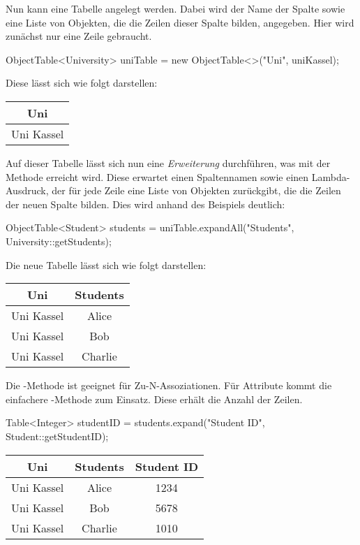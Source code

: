 Nun kann eine Tabelle angelegt werden.
Dabei wird der Name der Spalte sowie eine Liste von Objekten, die die Zeilen dieser Spalte bilden, angegeben.
Hier wird zunächst nur eine Zeile gebraucht.

\begin{jcodeblock}
    ObjectTable<University> uniTable = new ObjectTable<>("Uni", uniKassel);
\end{jcodeblock}

Diese lässt sich wie folgt darstellen:

\begin{tabular}{|c|}
    \hline
    \textbf{Uni} \\
    \hline
    Uni Kassel \\
    \hline
\end{tabular}

Auf dieser Tabelle lässt sich nun eine \emph{Erweiterung} durchführen, was mit der Methode  erreicht wird.
Diese erwartet einen Spaltennamen sowie einen Lambda-Ausdruck,
der für jede Zeile eine Liste von Objekten zurückgibt, die die Zeilen der neuen Spalte bilden.
Dies wird anhand des Beispiels deutlich:

\begin{jcodeblock}[breaklines]
    ObjectTable<Student> students = uniTable.expandAll("Students", University::getStudents);
\end{jcodeblock}

Die neue Tabelle lässt sich wie folgt darstellen:

\begin{tabular}{|c|c|}
    \hline
    \textbf{Uni} & \textbf{Students} \\
    \hline
    Uni Kassel & Alice   \\
    Uni Kassel & Bob     \\
    Uni Kassel & Charlie \\
    \hline
\end{tabular}

Die -Methode ist geeignet für Zu-N-Assoziationen.
Für Attribute kommt die einfachere -Methode zum Einsatz.
Diese erhält die Anzahl der Zeilen.

\begin{jcodeblock}[breaklines]
    Table<Integer> studentID = students.expand("Student ID", Student::getStudentID);
\end{jcodeblock}

\begin{tabular}{|c|c|c|}
    \hline
    \textbf{Uni} & \textbf{Students} & \textbf{Student ID} \\
    \hline
    Uni Kassel & Alice   & 1234 \\
    Uni Kassel & Bob     & 5678 \\
    Uni Kassel & Charlie & 1010 \\
    \hline
\end{tabular}

